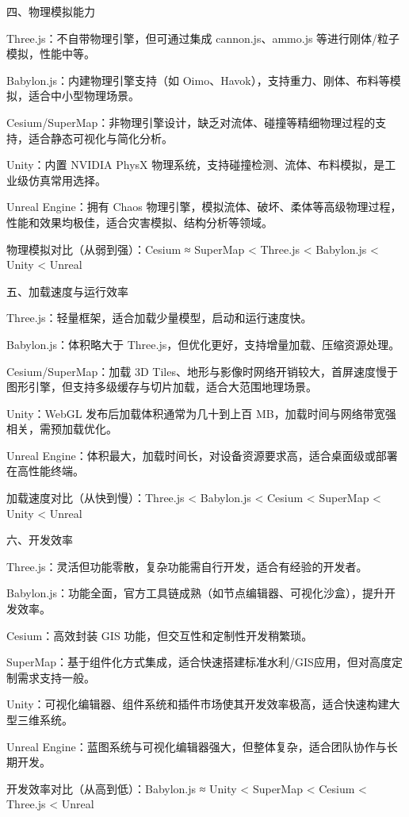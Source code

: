 四、物理模拟能力

Three.js：不自带物理引擎，但可通过集成 cannon.js、ammo.js 等进行刚体/粒子模拟，性能中等。

Babylon.js：内建物理引擎支持（如 Oimo、Havok），支持重力、刚体、布料等模拟，适合中小型物理场景。

Cesium/SuperMap：非物理引擎设计，缺乏对流体、碰撞等精细物理过程的支持，适合静态可视化与简化分析。

Unity：内置 NVIDIA PhysX 物理系统，支持碰撞检测、流体、布料模拟，是工业级仿真常用选择。

Unreal Engine：拥有 Chaos 物理引擎，模拟流体、破坏、柔体等高级物理过程，性能和效果均极佳，适合灾害模拟、结构分析等领域。

物理模拟对比（从弱到强）：Cesium ≈ SuperMap \textless{} Three.js \textless{} Babylon.js \textless{} Unity \textless{} Unreal

五、加载速度与运行效率

Three.js：轻量框架，适合加载少量模型，启动和运行速度快。

Babylon.js：体积略大于 Three.js，但优化更好，支持增量加载、压缩资源处理。

Cesium/SuperMap：加载 3D Tiles、地形与影像时网络开销较大，首屏速度慢于图形引擎，但支持多级缓存与切片加载，适合大范围地理场景。

Unity：WebGL 发布后加载体积通常为几十到上百 MB，加载时间与网络带宽强相关，需预加载优化。

Unreal Engine：体积最大，加载时间长，对设备资源要求高，适合桌面级或部署在高性能终端。

加载速度对比（从快到慢）：Three.js \textless{} Babylon.js \textless{} Cesium \textless{} SuperMap \textless{} Unity \textless{} Unreal

六、开发效率

Three.js：灵活但功能零散，复杂功能需自行开发，适合有经验的开发者。

Babylon.js：功能全面，官方工具链成熟（如节点编辑器、可视化沙盒），提升开发效率。

Cesium：高效封装 GIS 功能，但交互性和定制性开发稍繁琐。

SuperMap：基于组件化方式集成，适合快速搭建标准水利/GIS应用，但对高度定制需求支持一般。

Unity：可视化编辑器、组件系统和插件市场使其开发效率极高，适合快速构建大型三维系统。

Unreal Engine：蓝图系统与可视化编辑器强大，但整体复杂，适合团队协作与长期开发。

开发效率对比（从高到低）：Babylon.js ≈ Unity \textless{} SuperMap \textless{} Cesium \textless{} Three.js \textless{} Unreal

